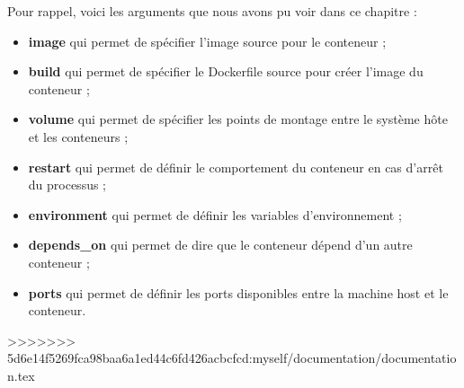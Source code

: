 \documentclass[12pt,a4paper]{article}
\begin{document}
Pour rappel, voici les arguments que nous avons pu voir dans ce chapitre :
\begin{itemize}
\item \textbf{image} qui permet de spécifier l'image source pour le conteneur ;
\item \textbf{build} qui permet de spécifier le Dockerfile source pour créer l'image du conteneur ;
\item \textbf{volume} qui permet de spécifier les points de montage entre le système hôte et les conteneurs ;
\item \textbf{restart} qui permet de définir le comportement du conteneur en cas d'arrêt du processus ;
\item \textbf{environment} qui permet de définir les variables d’environnement ;
\item \textbf{depends\_on} qui permet de dire que le conteneur dépend d'un autre conteneur ;
\item \textbf{ports} qui permet de définir les ports disponibles entre la machine host et le conteneur.
\end{itemize}
>>>>>>> 5d6e14f5269fca98baa6a1ed44c6fd426acbcfcd:myself/documentation/documentation.tex
\end{document}
